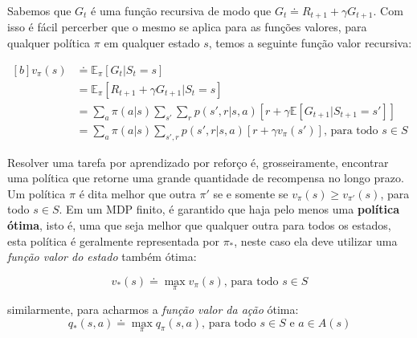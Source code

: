 Sabemos que $G_t$ é uma função recursiva de modo que $G_t \doteq R_{t+1} + \gamma G_{t+1}$. Com isso é fácil percerber que o mesmo se aplica para as funções valores, para qualquer política $\pi$ em qualquer estado $s$, temos a seguinte função valor recursiva:

\begin{equation}
   \begin{aligned}[b]
      v_\pi(s) &\doteq \mathbb{E}_\pi [G_t | S_t = s] \\
      &= \mathbb{E}_\pi [R_{t+1} + \gamma G_{t+1} | S_t = s] \\
      &= \sum_{a}\pi(a|s) \sum_{s'}\sum_{r}p(s', r | s, a)[r+\gamma\mathbb{E}[G_{t+1}|S_{t+1} = s']] \\
      &= \sum_{a}\pi(a|s)\sum_{s', r}p(s', r | s, a)[r + \gamma v_\pi(s')]\text{, para todo } s \in S
   \end{aligned}
   \label{recursive-state-value-function}
\end{equation}

Resolver uma tarefa por aprendizado por reforço é, grosseiramente, encontrar uma política que retorne uma grande quantidade de recompensa no longo prazo. Um política $\pi$ é dita melhor que outra $\pi'$ se e somente se $v_\pi(s) \geqslant v_{\pi'}(s)$, para todo  $s \in S$. Em um MDP finito, é garantido que haja pelo menos uma \textbf{política ótima}, isto é, uma que seja melhor que qualquer outra para todos os estados, esta política é geralmente representada por $\pi_\ast$, neste caso ela deve utilizar uma \textit{função valor do estado} também ótima:

\begin{equation} \label{state-value-optimal-function}
   v_\ast(s) \doteq \max_{\pi}v_\pi(s) \text{, para todo } s \in S
\end{equation}

similarmente, para acharmos a \textit{função valor da ação} ótima:
\begin{equation}\label{action-value-optimal-function}
   q_\ast(s,a) \doteq \max_{\pi}q_\pi(s,a) \text{, para todo } s \in S \text{ e } a \in A(s)
\end{equation}


